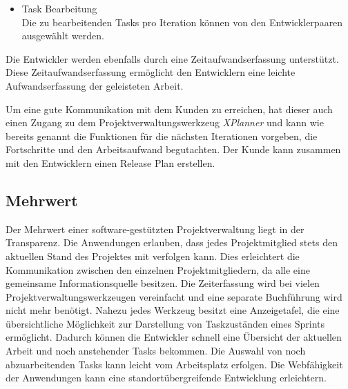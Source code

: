 \begin{description}
\begin{itemize}
\item Task Bearbeitung\\
Die zu bearbeitenden Tasks pro Iteration können von den Entwicklerpaaren ausgewählt werden. 
\end{itemize}

Die Entwickler werden ebenfalls durch eine Zeitaufwandserfassung unterstützt. Diese Zeitaufwandserfassung ermöglicht den Entwicklern eine leichte Aufwandserfassung der geleisteten Arbeit.

Um eine gute Kommunikation mit dem Kunden zu erreichen, hat dieser auch einen Zugang zu dem Projektverwaltungswerkzeug \emph{XPlanner} und kann wie bereits genannt die Funktionen für die nächsten Iterationen vorgeben, die Fortschritte und den Arbeitsaufwand begutachten. Der Kunde kann zusammen mit den Entwicklern einen Release Plan erstellen. \cite{bib:xplanner}

\end{description}

\subsection{Mehrwert}
Der Mehrwert einer software-gestützten Projektverwaltung liegt in der Transparenz. Die Anwendungen erlauben, dass jedes Projektmitglied stets den aktuellen Stand des Projektes mit verfolgen kann. Dies erleichtert die Kommunikation zwischen den einzelnen Projektmitgliedern, da alle eine gemeinsame Informationsquelle besitzen. Die Zeiterfassung wird bei vielen Projektverwaltungswerkzeugen vereinfacht und eine separate Buchführung wird nicht mehr benötigt. Nahezu jedes Werkzeug besitzt eine Anzeigetafel, die eine übersichtliche Möglichkeit zur Darstellung von Taskzuständen eines Sprints ermöglicht. Dadurch können die Entwickler schnell eine Übersicht der aktuellen Arbeit und noch anstehender Tasks bekommen. Die Auswahl von noch abzuarbeitenden Tasks kann leicht vom Arbeitsplatz erfolgen. Die Webfähigkeit der Anwendungen kann eine standortübergreifende Entwicklung erleichtern.
